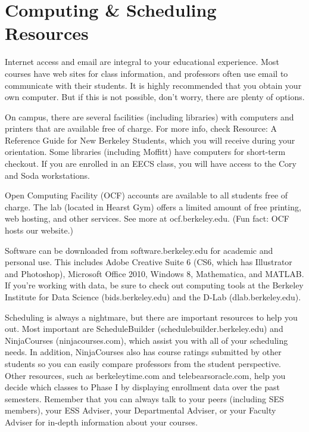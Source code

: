 \chapter*{Computing \& Scheduling Resources}

Internet access and email are integral to your educational experience. Most courses have web sites for class information, and professors often use email to communicate with their students. It is highly recommended that you obtain your own computer. But if this is not possible, don’t worry, there are plenty of options.

On campus, there are several facilities (including libraries) with computers and printers that are available free of charge. For more info, check Resource: A Reference Guide for New Berkeley Students, which you will receive during your orientation. Some libraries (including Moffitt) have computers for short-term checkout. If you are enrolled in an EECS class, you will have access to the Cory and Soda workstations.

Open Computing Facility (OCF) accounts are available to all students free of charge. The lab (located in Hearst Gym) offers a limited amount of free printing, web hosting, and other services. See more at {\selectfont ocf.berkeley.edu}. (Fun fact: OCF hosts our website.)

Software can be downloaded from {\selectfont software.berkeley.edu} for academic and personal use. This includes Adobe Creative Suite 6 (CS6, which has Illustrator and Photoshop), Microsoft Office 2010, Windows 8, Mathematica, and MATLAB. If you’re working with data, be sure to check out computing tools at the Berkeley Institute for Data Science ({\selectfont bids.berkeley.edu}) and the D-Lab ({\selectfont dlab.berkeley.edu}).

Scheduling is always a nightmare, but there are important resources to help you out. Most important are ScheduleBuilder ({\selectfont schedulebuilder.berkeley.edu}) and NinjaCourses ({\selectfont ninjacourses.com}), which assist you with all of your scheduling needs. In addition, NinjaCourses also has course ratings submitted by other students so you can easily compare professors from the student perspective. Other resources, such as {\selectfont berkeleytime.com} and {\selectfont telebearsoracle.com}, help you decide which classes to Phase I by displaying enrollment data over the past semesters. Remember that you can always talk to your peers (including SES members), your ESS Adviser, your Departmental Adviser, or your Faculty Adviser for in-depth information about your courses.


